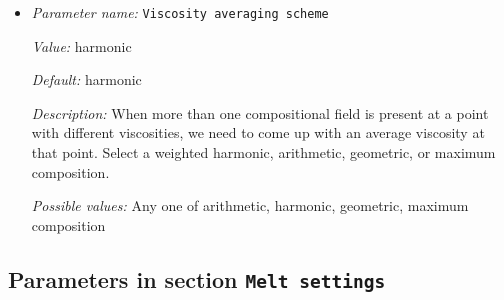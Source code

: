 \begin{itemize}
{\it Value:} 1.e21


{\it Default:} 1.e21


{\it Description:} List of viscosities for background mantle and compositional fields, for a total of N+1 values, where N is the number of compositional fields. If only one value is given, then all use the same value. Units: $Pa s$


{\it Possible values:} A list of 0 to 4294967295 elements where each element is [A floating point number $v$ such that $0 \leq v \leq \text{MAX\_DOUBLE}$]
\item {\it Parameter name:} {\tt Viscosity averaging scheme}
\label{parameters:Material model/Viscoelastic/Viscosity averaging scheme}


{\it Value:} harmonic


{\it Default:} harmonic


{\it Description:} When more than one compositional field is present at a point with different viscosities, we need to come up with an average viscosity at that point.  Select a weighted harmonic, arithmetic, geometric, or maximum composition.


{\it Possible values:} Any one of arithmetic, harmonic, geometric, maximum composition 
\end{itemize}

\subsection{Parameters in section \tt Melt settings}
\label{parameters:Melt_20settings}

